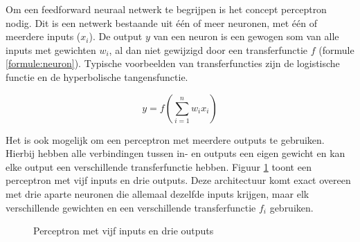 Om een feedforward neuraal netwerk te begrijpen is het concept perceptron nodig. Dit is een netwerk bestaande uit \'e\'en of meer neuronen, met \'e\'en of meerdere inputs ($x_i$). De output $y$ van een neuron is een gewogen som van alle inputs met gewichten $w_i$, al dan niet gewijzigd door een transferfunctie $f$ (formule \ref{formule:neuron}). Typische voorbeelden van transferfuncties zijn de logistische functie en de hyperbolische tangensfunctie.

\begin{equation}
    y = f(\sum\limits_{i=1}^{n}w_i x_i)
    \label{formule:neuron}
\end{equation}

Het is ook mogelijk om een perceptron met meerdere outputs te gebruiken. Hierbij hebben alle verbindingen tussen in- en outputs een eigen gewicht en kan elke output een verschillende transferfunctie hebben. Figuur \ref{fig:perceptron} toont een perceptron met vijf inputs en drie outputs. Deze architectuur komt exact overeen met drie aparte neuronen die allemaal dezelfde inputs krijgen, maar elk verschillende gewichten en een verschillende transferfunctie $f_i$ gebruiken.

\begin{figure}[ht]
\def\layersep{2.5cm}
\centering
{}
\caption{Perceptron met vijf inputs en drie outputs}
\label{fig:perceptron}
\end{figure}


